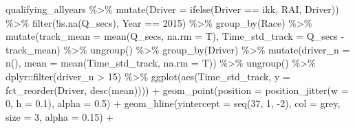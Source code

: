 \documentclass[
]{book}
\newenvironment{Shaded}{\begin{snugshade}}{\end{snugshade}}
\newcommand{\AttributeTok}[1]{\textcolor[rgb]{0.77,0.63,0.00}{#1}}
\newcommand{\DecValTok}[1]{\textcolor[rgb]{0.00,0.00,0.81}{#1}}
\newcommand{\FloatTok}[1]{\textcolor[rgb]{0.00,0.00,0.81}{#1}}
\newcommand{\FunctionTok}[1]{\textcolor[rgb]{0.00,0.00,0.00}{#1}}
\newcommand{\NormalTok}[1]{#1}
\newcommand{\SpecialCharTok}[1]{\textcolor[rgb]{0.00,0.00,0.00}{#1}}
\newcommand{\StringTok}[1]{\textcolor[rgb]{0.31,0.60,0.02}{#1}}
\begin{document}
\begin{Shaded}
\begin{Highlighting}[]
\NormalTok{qualifying\_allyears }\SpecialCharTok{\%\textgreater{}\%}
  \FunctionTok{mutate}\NormalTok{(}\AttributeTok{Driver =} \FunctionTok{ifelse}\NormalTok{(Driver }\SpecialCharTok{==} \StringTok{\textquotesingle{}ikk\textquotesingle{}}\NormalTok{, }\StringTok{\textquotesingle{}RAI\textquotesingle{}}\NormalTok{, Driver)) }\SpecialCharTok{\%\textgreater{}\%} 
  \FunctionTok{filter}\NormalTok{(}\SpecialCharTok{!}\FunctionTok{is.na}\NormalTok{(Q\_secs),}
\NormalTok{         Year }\SpecialCharTok{==} \DecValTok{2015}\NormalTok{) }\SpecialCharTok{\%\textgreater{}\%}
  \FunctionTok{group\_by}\NormalTok{(Race) }\SpecialCharTok{\%\textgreater{}\%}
  \FunctionTok{mutate}\NormalTok{(}\AttributeTok{track\_mean =} \FunctionTok{mean}\NormalTok{(Q\_secs, }\AttributeTok{na.rm =}\NormalTok{ T),}
         \AttributeTok{Time\_std\_track =}\NormalTok{ Q\_secs }\SpecialCharTok{{-}}\NormalTok{ track\_mean) }\SpecialCharTok{\%\textgreater{}\%} 
  \FunctionTok{ungroup}\NormalTok{() }\SpecialCharTok{\%\textgreater{}\%} 
  \FunctionTok{group\_by}\NormalTok{(Driver) }\SpecialCharTok{\%\textgreater{}\%} 
  \FunctionTok{mutate}\NormalTok{(}\AttributeTok{driver\_n =} \FunctionTok{n}\NormalTok{(),}
         \AttributeTok{mean =} \FunctionTok{mean}\NormalTok{(Time\_std\_track, }\AttributeTok{na.rm =}\NormalTok{ T)) }\SpecialCharTok{\%\textgreater{}\%}
  \FunctionTok{ungroup}\NormalTok{() }\SpecialCharTok{\%\textgreater{}\%}
\NormalTok{  dplyr}\SpecialCharTok{::}\FunctionTok{filter}\NormalTok{(driver\_n }\SpecialCharTok{\textgreater{}} \DecValTok{15}\NormalTok{) }\SpecialCharTok{\%\textgreater{}\%} 
  \FunctionTok{ggplot}\NormalTok{(}\FunctionTok{aes}\NormalTok{(Time\_std\_track, }\AttributeTok{y =} \FunctionTok{fct\_reorder}\NormalTok{(Driver, }\FunctionTok{desc}\NormalTok{(mean)))) }\SpecialCharTok{+}
  \FunctionTok{geom\_point}\NormalTok{(}\AttributeTok{position =} \FunctionTok{position\_jitter}\NormalTok{(}\AttributeTok{w =} \DecValTok{0}\NormalTok{, }\AttributeTok{h =} \FloatTok{0.1}\NormalTok{), }\AttributeTok{alpha =} \FloatTok{0.5}\NormalTok{) }\SpecialCharTok{+}
  \FunctionTok{geom\_hline}\NormalTok{(}\AttributeTok{yintercept =} \FunctionTok{seq}\NormalTok{(}\DecValTok{37}\NormalTok{, }\DecValTok{1}\NormalTok{, }\SpecialCharTok{{-}}\DecValTok{2}\NormalTok{), }\AttributeTok{col =} \StringTok{\textquotesingle{}grey\textquotesingle{}}\NormalTok{, }\AttributeTok{size =} \DecValTok{3}\NormalTok{, }\AttributeTok{alpha =} \FloatTok{0.15}\NormalTok{) }\SpecialCharTok{+}

\end{Highlighting}
\end{Shaded}
\end{document}
